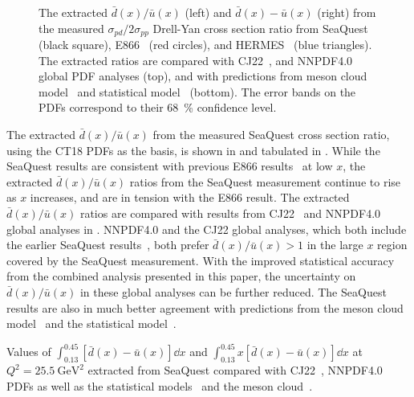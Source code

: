 \documentclass[reprint,aps,unsortedaddress,superscriptaddress,prl,floatfix,showpacs,linenumbers]{revtex4-2}
\begin{document}
\begin{figure}[htpb!]
\begin{subfigure}{0.45\linewidth}
	\end{subfigure}
	\caption{The extracted $\bar{d}(x)/\bar{u}(x)$ (left) and $\bar{d}(x)-\bar{u}(x)$ (right)
		from the measured $\sigma_{pd}/2\sigma_{pp}$ Drell-Yan cross section ratio
		from SeaQuest (black square), E866~\cite{towell2001} (red circles), and HERMES~\cite{ackerstaff1998} (blue triangles).
		The extracted ratios are compared with CJ22~\cite{accardi2023}, and NNPDF4.0~\cite{ball2022a} global PDF analyses (top),
		and with predictions from meson cloud model~\cite{alberg2022} and statistical model~\cite{soffer2019} (bottom).
		The error bands on the PDFs correspond to their \SI{68}{\percent} confidence level.
	}
	\label{fig:e906_e866_dbarubar}
\end{figure}

The extracted $\bar{d}(x)/\bar{u}(x)$ from the measured SeaQuest cross section ratio,
using the CT18 PDFs as the basis, is shown in 
and tabulated in .
While the SeaQuest results are consistent with previous E866
results~\cite{towell2001} at low $x$,
the extracted $\bar{d}(x)/\bar{u}(x)$ ratios from the SeaQuest measurement
continue to rise as $x$ increases,
and are in tension with the E866 result.
The extracted $\bar{d}(x)/\bar{u}(x)$ ratios are compared with results
from CJ22~\cite{accardi2023} and NNPDF4.0~\cite{ball2022a}
global analyses in .
NNPDF4.0 and the CJ22 global analyses, which both include the earlier SeaQuest results~\cite{dove2021},
both prefer $\bar{d}(x)/\bar{u}(x)>1$ in the large $x$ region covered by the SeaQuest measurement.
With the improved statistical accuracy from the combined analysis
presented in this paper, the uncertainty on $\bar{d}(x)/\bar{u}(x)$ in
these global analyses can be further reduced.
The SeaQuest results are also in much better agreement with
predictions from the meson cloud model~\cite{alberg2022}
and the statistical model~\cite{soffer2019}.

\begin{table}[htbp!]
	\centering
	\caption{Values of $\int_{0.13}^{0.45} \left[\bar{d}\left(x\right) - \bar{u}\left(x\right)\right] \dd{x}$
		and $\int_{0.13}^{0.45} x\left[\bar{d}\left(x\right) - \bar{u}\left(x\right)\right] \dd{x}$ at $Q^2=\SI{25.5}{\GeV\squared}$ extracted from
		SeaQuest compared with  CJ22~\cite{accardi2023}, NNPDF4.0~\cite{ball2022a}
		PDFs as well as the statistical models~\cite{soffer2019} and the meson cloud~\cite{alberg2022}.}
	\label{tab:dbarMubar}
	\begin{adjustbox}{max width=\linewidth}
		
	\end{adjustbox}
\end{table}
\end{document}
